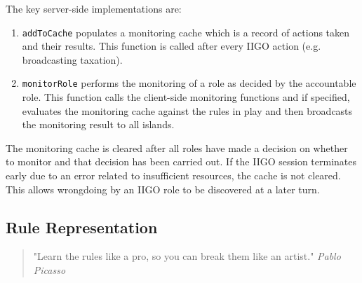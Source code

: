 The key server-side implementations are:
\begin{enumerate}
    \item \texttt{addToCache} populates a monitoring cache which is a record of actions taken and their results. This function is called after every IIGO action (e.g. broadcasting taxation).
    \item \texttt{monitorRole} performs the monitoring of a role as decided by the accountable role. This function calls the client-side monitoring functions and if specified, evaluates the monitoring cache against the rules in play and then broadcasts the monitoring result to all islands.
\end{enumerate}

The monitoring cache is cleared after all roles have made a decision on whether to monitor and that decision has been carried out. If the IIGO session terminates early due to an error related to insufficient resources, the cache is not cleared. This allows wrongdoing by an IIGO role to be discovered at a later turn.

\subsection{Rule Representation} \label{sec:rule_representation}

\begin{quote}
    "Learn the rules like a pro, so you can break them like an artist."
    \linebreak
    \noindent \emph{Pablo Picasso}
\end{quote}

